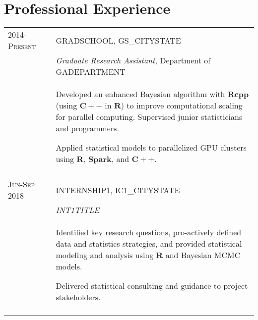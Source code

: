 \documentclass[a4paper,10pt]{article}
\begin{document}
\section{Professional Experience}
\begin{supertabular}{l p{0.55cm} p{13.9cm}}
	\textsc{2014-Present}				&& \textsc{GRADSCHOOL}, GS_CITYSTATE \\
	\small\textsc{}							&& \small	\emph{Graduate Research Assistant}, \small Department of GADEPARTMENT \\
															&& \begin{enumerate*}[label =$\diamond$,itemjoin={\newline}]
																	\item \footnotesize Developed an enhanced Bayesian algorithm with $\mathbf{Rcpp}$ (using $\mathbf{C++}$ in $\mathbf{R}$) to improve computational scaling for parallel computing. Supervised junior statisticians and programmers.
																	\item \footnotesize Applied statistical models to parallelized GPU clusters using $\mathbf{R}$, $\mathbf{Spark}$, and $\mathbf{C++}$.
																	\end{enumerate*} \vspace{2mm} \\

	 \\

	\textsc{Jun-Sep 2018}	&& \textsc{INTERNSHIP1}, IC1_CITYSTATE \\
												&& \small	\emph{INT1TITLE} \\
												&& \begin{enumerate*}[label =$\diamond$, itemjoin={\newline}]
														\item \footnotesize Identified key research questions, pro-actively defined data and statistics strategies, and provided statistical modeling and analysis using $\mathbf{R}$ and Bayesian MCMC models.
														\item \footnotesize Delivered statistical consulting and guidance to project stakeholders.	\end{enumerate*} \\
	 \\
	




\end{supertabular}
\end{document}
